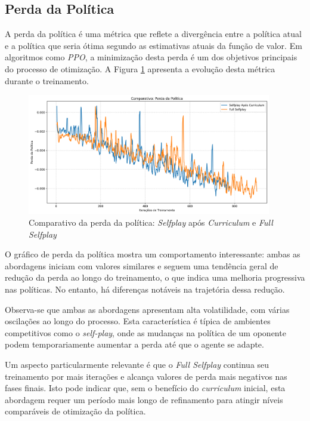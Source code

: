 \subsection{Perda da Política}

A perda da política é uma métrica que reflete a divergência entre a política atual e a política que seria ótima segundo as estimativas atuais da função de valor. Em algoritmos como \textit{PPO}, a minimização desta perda é um dos objetivos principais do processo de otimização. A Figura \ref{fig:policy_loss} apresenta a evolução desta métrica durante o treinamento.

\begin{figure}[H]
    \centering
    \includegraphics[width=0.95\textwidth]{fig/graficos_trabalho/graficos_experimentos/geral/comparativo_perda_politica.png}
    \caption{Comparativo da perda da política: \textit{Selfplay} após \textit{Curriculum} e \textit{Full Selfplay}}
    \label{fig:policy_loss}
\end{figure}

O gráfico de perda da política mostra um comportamento interessante: ambas as abordagens iniciam com valores similares e seguem uma tendência geral de redução da perda ao longo do treinamento, o que indica uma melhoria progressiva nas políticas. No entanto, há diferenças notáveis na trajetória dessa redução.

Observa-se que ambas as abordagens apresentam alta volatilidade, com várias oscilações ao longo do processo. Esta característica é típica de ambientes competitivos como o \textit{self-play}, onde as mudanças na política de um oponente podem temporariamente aumentar a perda até que o agente se adapte.

Um aspecto particularmente relevante é que o \textit{Full Selfplay} continua seu treinamento por mais iterações e alcança valores de perda mais negativos nas fases finais. Isto pode indicar que, sem o benefício do \textit{curriculum} inicial, esta abordagem requer um período mais longo de refinamento para atingir níveis comparáveis de otimização da política.

